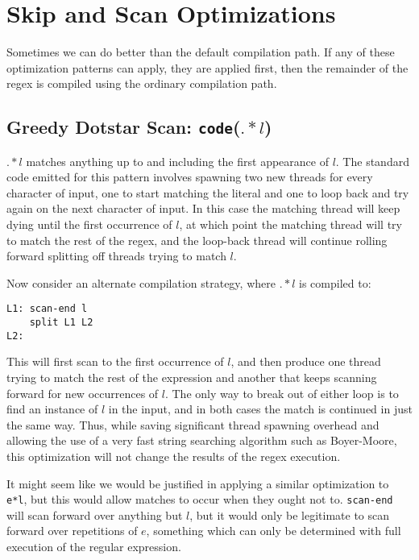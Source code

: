 \section{Skip and Scan Optimizations} \label{skipscanopt}

Sometimes we can do better than the default compilation path. If any of
these optimization patterns can apply, they are applied first, then
the remainder of the regex is compiled using the ordinary compilation
path.

\subsection{Greedy Dotstar Scan: {\tt code}($.*l$)}

$.*l$ matches anything up to and including the first appearance of $l$.
The standard code emitted for this pattern involves spawning two
new threads for every character of input, one to start matching
the literal and one to loop back and try again on the next character
of input. In this case the matching thread will keep dying until
the first occurrence of $l$, at which point the matching thread will
try to match the rest of the regex, and the loop-back thread will
continue rolling forward splitting off threads trying to match $l$.

Now consider an alternate compilation strategy, where $.*l$ is compiled
to:

\begin{verbatim}
L1: scan-end l
    split L1 L2
L2: 
\end{verbatim}

This will first scan to the first occurrence of $l$, and then produce
one thread trying to match the rest of the expression and another that
keeps scanning forward for new occurrences of $l$. The only way to
break out of either loop is to find an instance of $l$ in the input,
and in both cases the match is continued in just the same way. Thus,
while saving significant thread spawning overhead and allowing the use
of a very fast string searching algorithm such as Boyer-Moore, this
optimization will not change the results of the regex execution.

It might seem like we would be justified in applying a similar 
optimization to \verb'e*l', but this would allow matches to occur
when they ought not to. \verb'scan-end' will scan forward over anything
but $l$, but it would only be legitimate to scan forward over repetitions
of $e$, something which can only be determined with full execution of
the regular expression.

